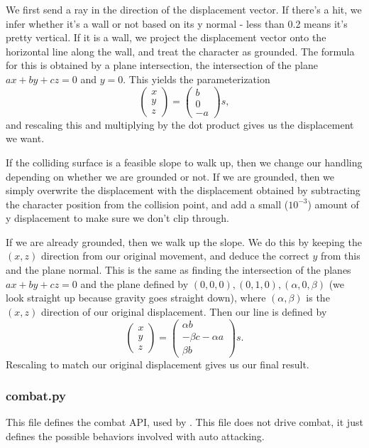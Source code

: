 \documentclass{article}
\begin{document}
We first send a ray in the direction of the displacement vector.
If there's a hit, we infer whether it's a wall or not based on its y normal -
less than 0.2 means it's pretty vertical. If it is a wall, we project the
displacement vector onto the horizontal line along the wall, and treat the character
as grounded.
The formula for this is obtained by a plane intersection, the intersection of the
plane $ax + by + cz = 0$ and $y = 0$. This yields the parameterization
\[
\begin{pmatrix}
    x\\
    y\\
    z 
\end{pmatrix} =
\begin{pmatrix}
    b\\0\\-a
\end{pmatrix}s,\]
and rescaling this and multiplying by the dot product gives us the displacement
we want.

If the colliding surface is a feasible slope to walk up, then we change
our handling depending on whether we are grounded or not. If we are grounded,
then we simply overwrite the displacement with the displacement obtained
by subtracting the character position from the collision point, and
add a small ($10^{-3}$) amount of y displacement to make sure we don't
clip through.

If we are already grounded, then we walk up the slope. We do this by keeping
the $(x, z)$ direction from our original movement, and deduce the correct
$y$ from this and the plane normal. This is the same as finding the
intersection of the planes $ax + by + cz = 0$ and the plane defined by
$(0, 0, 0), (0, 1, 0), (\alpha, 0, \beta)$ (we look straight up because gravity goes
straight down), where $(\alpha, \beta)$ is the $(x, z)$ direction of our
original displacement. Then our line is defined by
\[
\begin{pmatrix}
    x\\y\\z
\end{pmatrix} = 
\begin{pmatrix}
    \alpha b\\-\beta c - \alpha a\\\beta b
\end{pmatrix}s.\]
Rescaling to match our original displacement gives us our final result.
\subsubsection{combat.py}
This file defines the combat API, used by . This file does not
drive combat, it just defines the possible behaviors involved with auto attacking.
\end{document}
